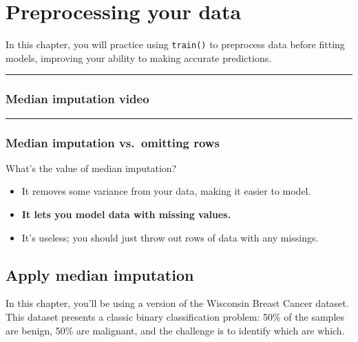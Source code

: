 \documentclass[
]{book}
\begin{document}
\hypertarget{preprocessing-your-data}{%
\chapter{Preprocessing your data}\label{preprocessing-your-data}}

In this chapter, you will practice using \texttt{train()} to preprocess data before fitting models, improving your ability to making accurate predictions.

\begin{center}\rule{0.5\linewidth}{0.5pt}\end{center}

\hypertarget{median-imputation-video}{%
\subsection*{Median imputation video}\label{median-imputation-video}}

\begin{center}\rule{0.5\linewidth}{0.5pt}\end{center}

\hypertarget{median-imputation-vs.-omitting-rows}{%
\subsection*{Median imputation vs.~omitting rows}\label{median-imputation-vs.-omitting-rows}}

What's the value of median imputation?

\begin{itemize}
\item
  It removes some variance from your data, making it easier to model.
\item
  \textbf{It lets you model data with missing values.}
\item
  It's useless; you should just throw out rows of data with any missings.
\end{itemize}

\hypertarget{apply-median-imputation}{%
\section{Apply median imputation}\label{apply-median-imputation}}

In this chapter, you'll be using a version of the Wisconsin Breast Cancer dataset. This dataset presents a classic binary classification problem: 50\% of the samples are benign, 50\% are malignant, and the challenge is to identify which are which.
\end{document}
